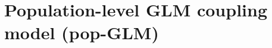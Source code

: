\documentclass[12pt]{article}
\begin{document}



\section{Population-level GLM coupling model (pop-GLM)}
\end{document}
